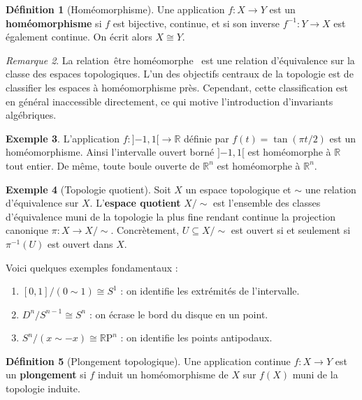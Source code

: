 \documentclass[12pt,a4paper,openany]{book}
\theoremstyle{definition}
\newtheorem{definition}{Définition}[chapter]
\newtheorem{exemple}[definition]{Exemple}
\theoremstyle{plain}
\theoremstyle{remark}
\newtheorem{remarque}[definition]{Remarque}
\newcommand{\R}{\mathbb{R}}
\newcommand{\RP}{\mathbb{R}\mathrm{P}}
\providecommand{\og}{\guillemotleft\,}
\providecommand{\fg}{\,\guillemotright}
\begin{document}
\begin{definition}[Homéomorphisme]\label{def:homeomorphisme}
Une application $f : X \to Y$ est un \textbf{homéomorphisme} si $f$ est
bijective, continue, et si son inverse $f^{-1} : Y \to X$ est également
continue. On écrit alors $X \cong Y$.
\end{definition}

\begin{remarque}\label{rem:homeo-equivalence}
La relation \og être homéomorphe \fg{} est une relation d'équivalence sur la
classe des espaces topologiques. L'un des objectifs centraux de la topologie est
de classifier les espaces à homéomorphisme près. Cependant, cette classification
est en général inaccessible directement, ce qui motive l'introduction
d'invariants algébriques.
\end{remarque}

\begin{exemple}\label{ex:homeo-intervalles}
L'application $f : {]}{-1},1{[} \to \R$ définie par $f(t) = \tan(\pi t / 2)$
est un homéomorphisme. Ainsi l'intervalle ouvert borné ${]}{-1},1{[}$ est
homéomorphe à $\R$ tout entier. De même, toute boule ouverte de $\R^n$ est
homéomorphe à $\R^n$.
\end{exemple}

\begin{exemple}[Topologie quotient]\label{ex:topologie-quotient}
Soit $X$ un espace topologique et $\sim$ une relation d'équivalence sur $X$.
L'\textbf{espace quotient} $X/{\sim}$ est l'ensemble des classes d'équivalence
muni de la topologie la plus fine rendant continue la projection canonique
$\pi : X \to X/{\sim}$. Concrètement, $U \subseteq X/{\sim}$ est ouvert si et
seulement si $\pi^{-1}(U)$ est ouvert dans $X$.

Voici quelques exemples fondamentaux :
\begin{enumerate}[label=(\alph*)]
\item $[0,1]/(0 \sim 1) \cong S^1$ : on identifie les extrémités de l'intervalle.
\item $D^n / S^{n-1} \cong S^n$ : on écrase le bord du disque en un point.
\item $S^n / (x \sim -x) \cong \RP^n$ : on identifie les points antipodaux.
\end{enumerate}
\end{exemple}

\begin{definition}[Plongement topologique]\label{def:plongement}
Une application continue $f : X \to Y$ est un \textbf{plongement} si $f$ induit
un homéomorphisme de $X$ sur $f(X)$ muni de la topologie induite.
\end{definition}
\end{document}
